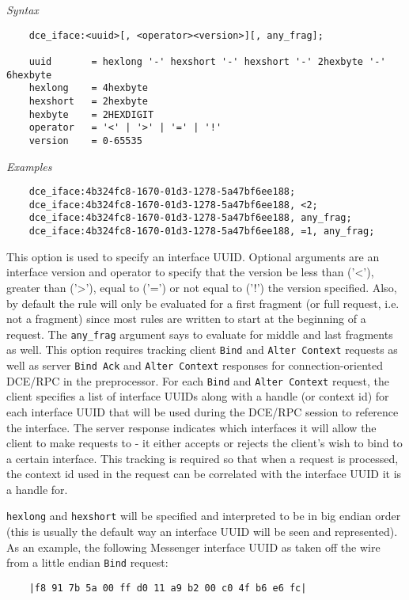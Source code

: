\documentclass[english]{report}
\begin{document}
\begin{itemize}
\textit{Syntax}
\footnotesize
\begin{verbatim}
    dce_iface:<uuid>[, <operator><version>][, any_frag];

    uuid       = hexlong '-' hexshort '-' hexshort '-' 2hexbyte '-' 6hexbyte
    hexlong    = 4hexbyte
    hexshort   = 2hexbyte
    hexbyte    = 2HEXDIGIT
    operator   = '<' | '>' | '=' | '!'
    version    = 0-65535
\end{verbatim}
\normalsize
\textit{Examples}
\footnotesize
\begin{verbatim}
    dce_iface:4b324fc8-1670-01d3-1278-5a47bf6ee188;
    dce_iface:4b324fc8-1670-01d3-1278-5a47bf6ee188, <2;
    dce_iface:4b324fc8-1670-01d3-1278-5a47bf6ee188, any_frag;
    dce_iface:4b324fc8-1670-01d3-1278-5a47bf6ee188, =1, any_frag;
\end{verbatim}
\normalsize

This option is used to specify an interface UUID. Optional arguments are an
interface version and operator to specify that the version be less than
('\textless'), greater than ('\textgreater'), equal to ('=') or not equal to
('!') the version specified.  Also, by default the rule will only be evaluated
for a first fragment (or full request, i.e. not a fragment) since most rules
are written to start at the beginning of a request. The \texttt{any\_frag}
argument says to evaluate for middle and last fragments as well.  This option
requires tracking client \texttt{Bind} and \texttt{Alter Context} requests as
well as server \texttt{Bind Ack} and \texttt{Alter Context} responses for
connection-oriented DCE/RPC in the preprocessor. For each \texttt{Bind} and
\texttt{Alter Context} request, the client specifies a list of interface UUIDs
along with a handle (or context id) for each interface UUID that will be used
during the DCE/RPC session to reference the interface.  The server response
indicates which interfaces it will allow the client to make requests to - it
either accepts or rejects the client's wish to bind to a certain interface.
This tracking is required so that when a request is processed, the context id
used in the request can be correlated with the interface UUID it is a handle
for.

\texttt{hexlong} and \texttt{hexshort} will be specified and interpreted to be
in big endian order (this is usually the default way an interface UUID will be
seen and represented). As an example, the following Messenger interface UUID as
taken off the wire from a little endian \texttt{Bind} request:

\begin{verbatim}
    |f8 91 7b 5a 00 ff d0 11 a9 b2 00 c0 4f b6 e6 fc|
\end{verbatim}


\end{itemize}
\end{document}
